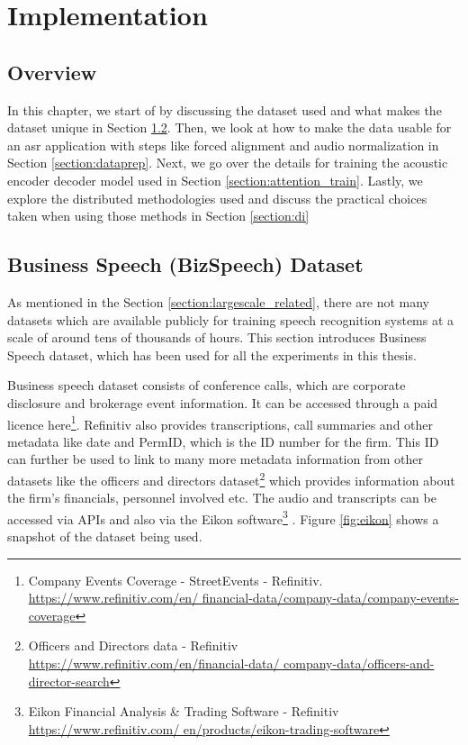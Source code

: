 \chapter{Implementation}
\label{chapter:methods}

\section{Overview}
In this chapter, we start of by discussing the dataset used and what makes the dataset unique in Section \ref{section:bizspeech}. Then, we look at how to make the data usable for an \acrshort{asr} application with steps like forced alignment and audio normalization in Section \ref{section:dataprep}. Next, we go over the details for training the acoustic encoder decoder model used in Section \ref{section:attention_train}. Lastly, we explore the distributed methodologies used and discuss the practical choices taken when using those methods in Section \ref{section:di}



\section{Business Speech (BizSpeech) Dataset}
\label{section:bizspeech}
As mentioned in the Section \ref{section:largescale_related}, there are not many datasets which are available publicly for training speech recognition systems at a scale of around tens of thousands of hours. This section introduces Business Speech dataset, which has been used for all the experiments in this thesis. 

Business speech dataset consists of conference calls, which are corporate disclosure and brokerage event information. It can be accessed through a paid licence here\footnote{Company Events Coverage - StreetEvents - Refinitiv. \href{https://www.refinitiv.com/en/financial-data/company-data/company-events-coverage}{https://www.refinitiv.com/en/ financial-data/company-data/company-events-coverage}}. Refinitiv also provides transcriptions, call summaries and other metadata like date and PermID, which is the ID number for the firm. This ID can further be used to link to many more metadata information from other datasets like the officers and directors dataset\footnote{Officers and Directors data - Refinitiv \href{https://www.refinitiv.com/en/financial-data/company-data/officers-and-director-search}{https://www.refinitiv.com/en/financial-data/ company-data/officers-and-director-search}} which provides information about the firm's financials, personnel involved etc. The audio and transcripts can be accessed via APIs and also via the Eikon software\footnote{Eikon Financial Analysis \& Trading Software - Refinitiv \href{https://www.refinitiv.com/en/products/eikon-trading-software}{https://www.refinitiv.com/ en/products/eikon-trading-software}} \cite{August2011ThomsonEikon}. Figure \ref{fig:eikon} shows a snapshot of the dataset being used.

